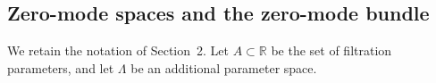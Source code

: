 \documentclass[pdflatex,sn-mathphys-num]{sn-jnl}%
\theoremstyle{thmstyleone}%
\newtheorem{proposition}[theorem]{Proposition}%
\theoremstyle{thmstyletwo}%
\theoremstyle{thmstylethree}%
\newtheorem{definition}{Definition}%
\begin{document}






\subsection{Zero-mode spaces and the zero-mode bundle}

We retain the notation of Section~2. Let \(A\subset \mathbb{R}\) be the set of
filtration parameters, and let \(\Lambda\) be an additional parameter space.
\end{document}
